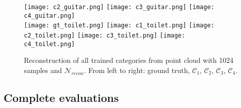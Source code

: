 \begin{figure}[htbp]
    \texttt{[image: c2\_guitar.png]}
    \texttt{[image: c3\_guitar.png]}
    \texttt{[image: c4\_guitar.png]}\\
    \texttt{[image: gt\_toilet.png]}
    \texttt{[image: c1\_toilet.png]}
    \texttt{[image: c2\_toilet.png]}
    \texttt{[image: c3\_toilet.png]}
    \texttt{[image: c4\_toilet.png]}\\
    \caption{Reconstruction of all trained categories from point cloud with 1024 samples and $\mathcal{N}_{recon}$.
              From left to right: ground truth, $\mathcal{C}_1$, $\mathcal{C}_2$, $\mathcal{C}_3$, $\mathcal{C}_4$.} \label{fig:last}
  \end{figure}

\subsection*{Complete evaluations}
\label{completeopt}

